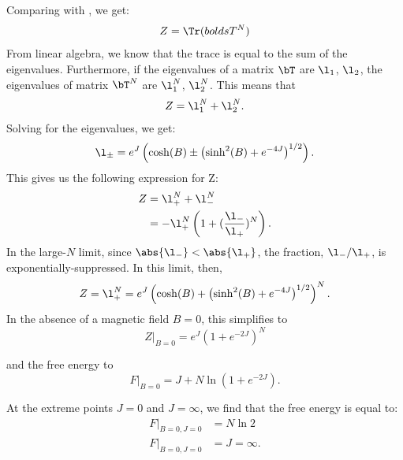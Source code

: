 Comparing with , we get:
\begin{equation}%
  Z=\Tr(bolds{T}^N)
\end{equation}%
From linear algebra, we know that the trace is equal to the sum of the
eigenvalues. Furthermore, if the eigenvalues of a matrix $\bT$ are
$\l_1$, $\l_2$, the eigenvalues of matrix $\bT^N$ are $\l_1^N$,
$\l_2^N$. This means that%
\begin{equation}%
  Z=\l_1^N+\l_2^N.
\end{equation}%
Solving for the eigenvalues, we get:%
\begin{equation}%
  \l_\pm =e^J \left( \cosh(B)\pm\left(\sinh^2(B)+e^{-4J}\right)^{1/2}\right).
\end{equation}%
This gives us the following expression for Z:%
\begin{align}%
  Z &=\l_+^N+\l_{-}^N\\
    &=-\l_+^N\left(1+(\frac{\l_{-}}{\l_+})^N\right).
\end{align}%
In the large-$N$ limit, since $\abs{\l_{-}}<\abs{\l_+}$, the fraction,
$\l_-/\l_+$, is exponentially-suppressed. In this limit, then,
\begin{equation}%
  Z=\l_+^N=e^J \left( \cosh(B)+\left(\sinh^2(B)+e^{-4J}\right)^{1/2}\right)^N.
  \label{eq:ising-1d-partition-fn}
\end{equation}%
In the absence of a magnetic field $B=0$, this simplifies to
\begin{equation}%
  Z\rvert_{B=0}= e^{J}{(1+e^{-2J})}^N
\end{equation}%

and the free energy to
\begin{equation}%
  F\rvert_{B=0}= J+ N\ln \left(1+e^{-2J}\right).
  \label{eq:ising-1d-free-energy}
\end{equation}%

At the extreme points $J=0$ and $J=\infty$, we find that the free
energy is equal to:%
\begin{align}%
  F\rvert_{B=0,J=0}&=N\ln 2\\
  F\rvert_{B=0,J=0}&=J=\infty.\label{eq:ising-1d-free-energy-at-fixed-pts}
\end{align}%

